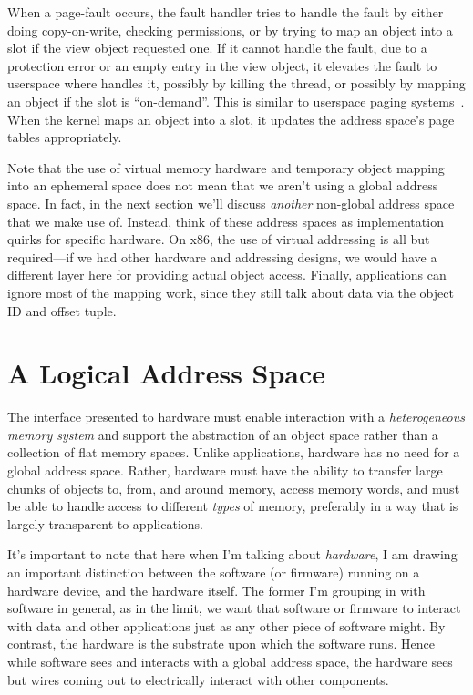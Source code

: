 When a page-fault occurs, the fault handler tries to handle the fault by either doing copy-on-write,
checking permissions, or by trying to map an object into a slot if the view object requested one.
If it cannot handle the fault, \eg due to a protection error or an empty entry in the view
object, it elevates the fault to userspace where \libcore handles it, possibly by killing the
thread, or possibly by mapping an object if the slot is ``on-demand''. This is similar to userspace
paging systems~\cite{l4,accetta:usenix86s}. When the kernel
maps an object into a slot, it updates the address space's page tables appropriately.

Note that the use of virtual memory hardware and temporary object mapping into an ephemeral space does not mean that we
aren't using a global address space. In fact, in the next section we'll discuss \emph{another} non-global address space
that we make use of. Instead, think of these address spaces as implementation quirks for specific hardware. On x86, the
use of virtual addressing is all but required---if we had other hardware and addressing designs, we would have a
different layer here for providing actual object access. Finally, applications can ignore most of the \libcore mapping
work, since they still talk about data via the object ID and offset tuple.

\section{A Logical Address Space}

The interface presented to hardware must enable interaction with a
\textit{heterogeneous memory system} and support the abstraction of an object space rather than a
collection of flat memory spaces. Unlike applications, hardware has no need for
a global address space. Rather, hardware must
have the ability to transfer large chunks of objects to, from, and around memory, access memory words, and must be able to
handle access to different \emph{types} of memory, preferably in a way that is largely transparent to
applications.

It's important to note that here when I'm talking about \emph{hardware}, I am drawing an important distinction between
the software (or firmware) running on a hardware device, and the hardware itself. The former I'm grouping in with
software in general, as in the limit, we want that software or firmware to interact with data and other applications
just as any other piece of software might. By contrast, the hardware is the substrate upon which the software runs.
Hence while software sees and interacts with a global address space, the hardware sees but wires coming out to
electrically interact with other components.


